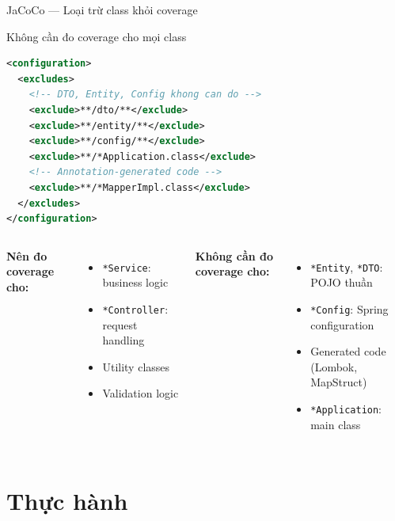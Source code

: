 \documentclass[aspectratio=169,12pt]{beamer}
\begin{document}
\begin{frame}[fragile,shrink=18]{JaCoCo --- Loại trừ class khỏi coverage}
  \begin{block}{Không cần đo coverage cho mọi class}
\begin{lstlisting}[language=xml]
<configuration>
  <excludes>
    <!-- DTO, Entity, Config khong can do -->
    <exclude>**/dto/**</exclude>
    <exclude>**/entity/**</exclude>
    <exclude>**/config/**</exclude>
    <exclude>**/*Application.class</exclude>
    <!-- Annotation-generated code -->
    <exclude>**/*MapperImpl.class</exclude>
  </excludes>
</configuration>
\end{lstlisting}
  \end{block}

  \vspace{0.3em}
  \begin{columns}
    \textbf{Nên đo coverage cho:}
    \begin{itemize}
      \item \texttt{*Service}: business logic
      \item \texttt{*Controller}: request handling
      \item Utility classes
      \item Validation logic
    \end{itemize}

    \textbf{Không cần đo coverage cho:}
    \begin{itemize}
      \item \texttt{*Entity}, \texttt{*DTO}: POJO thuần
      \item \texttt{*Config}: Spring configuration
      \item Generated code (Lombok, MapStruct)
      \item \texttt{*Application}: main class
    \end{itemize}
  \end{columns}
\end{frame}

\section{Thực hành}
\end{document}
